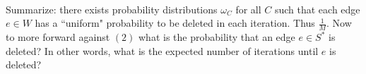 \documentclass[letterpaper,12pt,oneside,onecolumn]{article}
\begin{document}
\paragraph{}
Summarize: there exists probability distributions $\omega_C$ for all $C$ such that each edge $e \in W$ has a ``uniform" probability to be deleted in each iteration. Thus $\frac{1}{M}$. Now to more forward against $(2)$ what is the probability that an edge $e \in S^*$ is deleted? In other words, what is the expected number of iterations until $e$ is deleted?
\end{document}
